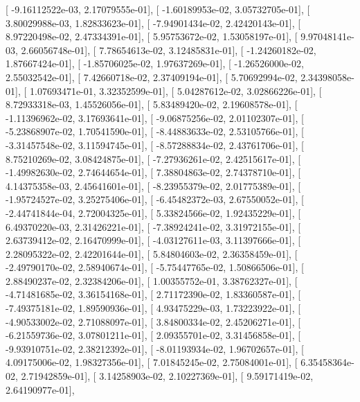 \documentclass{article}
\begin{document}
       [ -9.16112522e-03,   2.17079555e-01],
       [ -1.60189953e-02,   3.05732705e-01],
       [  3.80029988e-03,   1.82833623e-01],
       [ -7.94901434e-02,   2.42420143e-01],
       [  8.97220498e-02,   2.47334391e-01],
       [  5.95753672e-02,   1.53058197e-01],
       [  9.97048141e-03,   2.66056748e-01],
       [  7.78654613e-02,   3.12485831e-01],
       [ -1.24260182e-02,   1.87667424e-01],
       [ -1.85706025e-02,   1.97637269e-01],
       [ -1.26526000e-02,   2.55032542e-01],
       [  7.42660718e-02,   2.37409194e-01],
       [  5.70692994e-02,   2.34398058e-01],
       [  1.07693471e-01,   3.32352599e-01],
       [  5.04287612e-02,   3.02866226e-01],
       [  8.72933318e-03,   1.45526056e-01],
       [  5.83489420e-02,   2.19608578e-01],
       [ -1.11396962e-02,   3.17693641e-01],
       [ -9.06875256e-02,   2.01102307e-01],
       [ -5.23868907e-02,   1.70541590e-01],
       [ -8.44883633e-02,   2.53105766e-01],
       [ -3.31457548e-02,   3.11594745e-01],
       [ -8.57288834e-02,   2.43761706e-01],
       [  8.75210269e-02,   3.08424875e-01],
       [ -7.27936261e-02,   2.42515617e-01],
       [ -1.49982630e-02,   2.74644654e-01],
       [  7.38804863e-02,   2.74378710e-01],
       [  4.14375358e-03,   2.45641601e-01],
       [ -8.23955379e-02,   2.01775389e-01],
       [ -1.95724527e-02,   3.25275406e-01],
       [ -6.45482372e-03,   2.67550052e-01],
       [ -2.44741844e-04,   2.72004325e-01],
       [  5.33824566e-02,   1.92435229e-01],
       [  6.49370220e-03,   2.31426221e-01],
       [ -7.38924241e-02,   3.31972155e-01],
       [  2.63739412e-02,   2.16470999e-01],
       [ -4.03127611e-03,   3.11397666e-01],
       [  2.28095322e-02,   2.42201644e-01],
       [  5.84804603e-02,   2.36358459e-01],
       [ -2.49790170e-02,   2.58940674e-01],
       [ -5.75447765e-02,   1.50866506e-01],
       [  2.88490237e-02,   2.32384206e-01],
       [  1.00355752e-01,   3.38762327e-01],
       [ -4.71481685e-02,   3.36154168e-01],
       [  2.71172390e-02,   1.83360587e-01],
       [ -7.49375181e-02,   1.89590936e-01],
       [  4.93475229e-03,   1.73223922e-01],
       [ -4.90533002e-02,   2.71088097e-01],
       [  3.84800334e-02,   2.45206271e-01],
       [ -6.21559736e-02,   3.07801211e-01],
       [  2.09355701e-02,   3.31456858e-01],
       [ -9.93910751e-02,   2.38212392e-01],
       [ -8.01193934e-02,   1.96702657e-01],
       [  4.09175006e-02,   1.98327356e-01],
       [  7.01845245e-02,   2.75084001e-01],
       [  6.35458364e-02,   2.71942859e-01],
       [  3.14258903e-02,   2.10227369e-01],
       [  9.59171419e-02,   2.64190977e-01],
\end{document}
